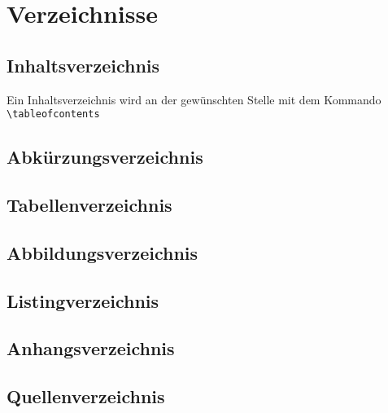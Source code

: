 \section{Verzeichnisse}
\subsection{Inhaltsverzeichnis}
Ein Inhaltsverzeichnis wird an der gewünschten Stelle mit dem Kommando 
\lstinline$ \tableofcontents $
\subsection{Abkürzungsverzeichnis}
\subsection{Tabellenverzeichnis}
\subsection{Abbildungsverzeichnis}
\subsection{Listingverzeichnis}
\subsection{Anhangsverzeichnis}
\subsection{Quellenverzeichnis}



\listoffigures %
\listoftables %
\lstlistoflistings %